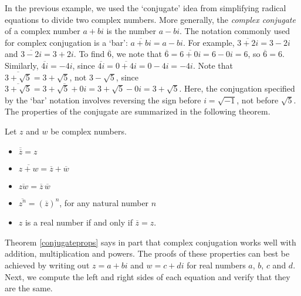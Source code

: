 \documentclass{ximera}
\begin{document}
In the previous example, we used the `conjugate' idea from simplifying radical equations %
to divide two complex numbers.  More generally, the \emph{complex conjugate} of a complex number $a+bi$ is the number $a-bi$.  The notation commonly used for complex conjugation is a `bar':  $\overline{a+bi} = a-bi$. For example, $\overline{3+2i} = 3-2i$ and $\overline{3-2i} = 3+2i$. To find $\overline{6}$, we note that $\overline{6} = \overline{6+0i}= 6 - 0i = 6$, so $\overline{6} = 6$. Similarly, $\overline{4i} = -4i$, since $\overline{4i} = \overline{0 + 4i} = 0 - 4i =  -4i$.  Note that $\overline{3+\sqrt{5}} = 3 + \sqrt{5}$, not $3 - \sqrt{5}$, since  $\overline{3+\sqrt{5}} = \overline{3+\sqrt{5} + 0i} = 3+\sqrt{5}  - 0i = 3+\sqrt{5}$. Here, the conjugation specified by the `bar' notation involves reversing the sign before $i = \sqrt{-1}$, not before  $\sqrt{5}$.  The properties of the conjugate are summarized in the following theorem.

\begin{theorem}
    \label{conjugateprops} 
     Let $z$ and $w$ be complex numbers. 
    \begin{itemize}
        \item  $\overline{\overline{z}} = z$
        \item  $ \overline{z+w} = \overline{z} + \overline{w}$
        \item  $ \overline{zw} = \overline{z} \, \overline{w}$
        \item  $\overline{z^{n}} = \left(\overline{z}\right)^n$, for any natural number $n$
        \item  $z$ is a real number if and only if $\overline{z} = z$.
    \end{itemize}
\end{theorem}



Theorem \ref{conjugateprops} says in part that complex conjugation works well with addition, multiplication and powers.  The proofs of these properties can best be achieved by writing out $z = a+bi$ and $w = c+di$ for real numbers $a$, $b$, $c$ and $d$.   Next, we compute the left and right sides of each equation and verify that they are the same.  
\end{document}
